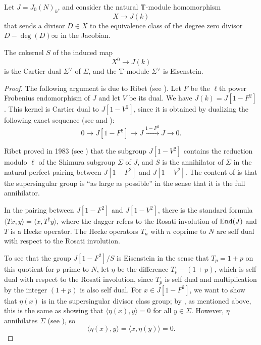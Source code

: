 \documentclass{article} \usepackage[active]{srcltx}
\begin{document}
Let $J=J_0(N)_k$, and consider the natural $\mathbb{T}$-module homomorphism
\begin{equation}\label{eqn:sspointsXJ}
X \to J(k)
\end{equation}
that sends a divisor $D\in X$ to the equivalence class of the degree
zero divisor $D-\deg(D)\infty$ in the Jacobian.
\begin{proposition}[Ribet]\label{prop:ribet}
The cokernel $S$ of the induced map
\begin{equation}\label{eqn:sspointsonJ}
X^0 \to J(k)
\end{equation}
is the Cartier dual $\Sigma^{\vee}$ of $\Sigma$, and
the $\mathbb{T}$-module $\Sigma^{\vee}$ is Eisenstein. 
\end{proposition}
\begin{proof}
  The following argument is due to Ribet (see \cite{ribet:2010-eis}).
  Let $F$ be the $\ell$th power Frobenius endomorphism of $J$
  and let $V$ be its dual.  We have $J(k) =
  J[1-F^2]$.  This kernel is Cartier dual to $J[1-V^2]$, since
  it is obtained by dualizing the following exact sequence (see
  \cite[\S15, pg.~143]{mumford:abvars} and \cite[\S11]{milne:abvars}):
  $$
    0 \to J[1-F^2] \to J \xrightarrow{1-F^2} J \to 0.
  $$

  Ribet proved in 1983 (see \cite[Prop.~3.6]{prasad:ribet}) that the
  subgroup $J[1-V^2]$ contains the reduction modulo $\ell$ of the
  Shimura subgroup $\Sigma$ of $J$, and $S$ is the annihilator of
  $\Sigma$ in the natural perfect pairing between $J[1-F^2]$ and
  $J[1-V^2]$.  The content of \cite[Prop.~3.6]{prasad:ribet} is that
  the supersingular group is ``as large as possible'' in the sense
  that it is the full annihilator.

  In the pairing between  $J[1-F^2]$ and $J[1-V^2]$, there is the standard formula
  $\langle T x, y \rangle = \langle x, T^\dagger y\rangle$, where the dagger
  refers to the Rosati involution of $\operatorname{End}(J)$ and $T$ is a Hecke
  operator.  The Hecke operators $T_n$ with $n$ coprime to $N$ are self dual with
  respect to the Rosati involution.  

To see that the group $J[1-F^2]/S$ is Eisenstein in the sense that
$T_p = 1+p$ on this quotient for $p$ prime to $N$, let $\eta$ be the
difference $T_p - (1+p)$, which is self dual with respect to the
Rosati involution, since $T_p$ is self dual and multiplication by the
integer $(1+p)$ is also self dual.  For $x \in J[1-F^2]$, we want to
show that $\eta(x)$ is in the supersingular divisor class group; 
by \cite[Prop.~3.6]{prasad:ribet}, as mentioned above,
this is the same as showing that $\langle \eta(x),y \rangle = 0$ for
all $y \in \Sigma$.  However, $\eta$ annihilates $\Sigma$ (see
\cite[Thm.~1]{ribet:comp}), so
$$\langle \eta(x), y\rangle = \langle x, \eta(y)\rangle = 0.$$
\end{proof}
\end{document}
